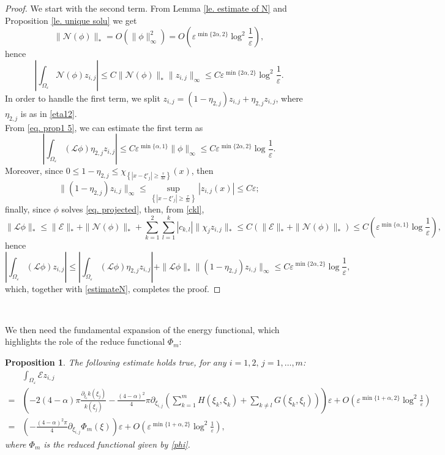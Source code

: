 \documentclass[11pt]{article}
\newtheorem{proposition}{Proposition}[section]
\begin{document}
\begin{proof}
We start with the second term. From Lemma \ref{le. estimate of N} and Proposition \ref{le. unique solu} we get
$$\|\mathcal N(\phi)\|_\ast=O\left(\|\phi\|_\infty^2\right)=O\left(\varepsilon^{\min\{2\alpha,2\}}\log^2\frac1\varepsilon\right),$$
hence
\begin{equation}\label{estimateN}
\left|\int_{\Omega_\varepsilon}\mathcal N(\phi)z_{i,j}\right|\le C\|\mathcal N(\phi)\|_\ast\|z_{i,j}\|_\infty\le C\varepsilon^{\min\{2\alpha,2\}}\log^2\frac1\varepsilon.
\end{equation}
In order to handle the first term, we split $z_{i,j}=(1-\eta_{2,j})z_{i,j}+\eta_{2,j}z_{i,j}$, where $\eta_{2,j}$ is as in \eqref{eta12}.\\
From \eqref{eq. prop1 5}, we can estimate the first term as
$$\left|\int_{\Omega_\varepsilon}(\mathcal L\phi)\eta_{2,j}z_{i,j}\right|\le C\varepsilon^{\min\{\alpha,1\}}\|\phi\|_\infty\le C\varepsilon^{\min\{2\alpha,2\}}\log\frac1\varepsilon.$$
Moreover, since $0\le1-\eta_{2,j}\le\chi_{\left\{\left|x-\xi'_j\right|\ge\frac\tau{3\varepsilon}\right\}}(x)$, then
$$\|(1-\eta_{2,j})z_{i,j}\|_\infty\le\sup_{\left\{\left|x-\xi'_j\right|\ge\frac\tau{3\varepsilon}\right\}}|z_{i,j}(x)|\le C\varepsilon;$$
finally, since $\phi$ solves \eqref{eq. projected}, then, from \eqref{ckl},
$$\|\mathcal L\phi\|_\ast\le\|\mathcal E\|_\ast+\|\mathcal N(\phi)\|_\ast+\sum_{k=1}^2\sum_{l=1}^k|c_{k,l}|\|\chi_jz_{i,j}\|_\ast\le C\left(\|\mathcal E\|_\ast+\|\mathcal N(\phi)\|_\ast\right)\le C\left(\varepsilon^{\min\{\alpha,1\}}\log\frac1\varepsilon\right),$$
hence
$$\left|\int_{\Omega_\varepsilon}(\mathcal L\phi)z_{i,j}\right|\le\left|\int_{\Omega_\varepsilon}(\mathcal L\phi)\eta_{2,j}z_{i,j}\right|+\|\mathcal L\phi\|_\ast\|(1-\eta_{2,j})z_{i,j}\|_\infty\le C\varepsilon^{\min\{2\alpha,2\}}\log\frac1\varepsilon,$$
which, together with \eqref{estimateN}, completes the proof.
\end{proof}\

We then need the fundamental expansion of the energy functional, which highlights the role of the reduce functional $\Phi_m$:

\begin{proposition}\label{mainorder}
The following estimate holds true, for any $i=1,2,\,j=1,\dots,m$:
\begin{align*}
&\int_{\Omega_\varepsilon}\mathcal Ez_{i,j}\\
=&\left(-2(4-\alpha)\pi\frac{\partial_{\xi_i}k(\xi_j)}{k(\xi_j)}-\frac{(4-\alpha)^2}4\pi\partial_{\xi_{i,j}}\left(\sum_{k=1}^mH(\xi_k,\xi_k)+\sum_{k\ne l}G(\xi_k,\xi_l)\right)\right)\varepsilon+O\left(\varepsilon^{\min\{1+\alpha,2\}}\log^2\frac1\varepsilon\right)\\
=&\left(-\frac{(4-\alpha)^2\pi}4\partial_{\xi_{i,j}}\Phi_m(\xi)\right)\varepsilon+O\left(\varepsilon^{\min\{1+\alpha,2\}}\log^2\frac1\varepsilon\right),
\end{align*}
where $\Phi_m$ is the reduced functional given by \eqref{phi}.
\end{proposition}
\end{document}
